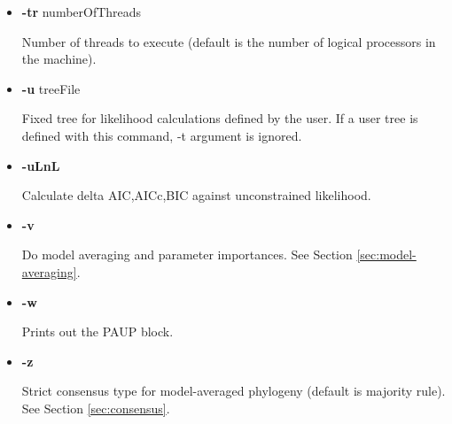\begin{itemize}
\item  {\bf -tr} numberOfThreads

Number of threads to execute (default is the number of logical processors in the machine).

\item  {\bf -u} treeFile

Fixed tree for likelihood calculations defined by the user. If a user tree is defined with this command, -t argument is ignored.

\item  {\bf -uLnL}

Calculate delta AIC,AICc,BIC against unconstrained likelihood.

\item  {\bf -v}

Do model averaging and parameter importances. See Section \ref{sec:model-averaging}.

\item  {\bf -w}

Prints out the PAUP block.

\item  {\bf -z}

Strict consensus type for model-averaged phylogeny (default is majority rule). See Section \ref{sec:consensus}.

\end{itemize}
